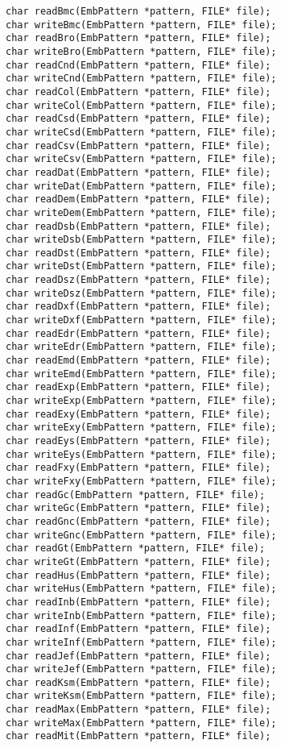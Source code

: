 \begin{lstlisting}
char readBmc(EmbPattern *pattern, FILE* file);
char writeBmc(EmbPattern *pattern, FILE* file);
char readBro(EmbPattern *pattern, FILE* file);
char writeBro(EmbPattern *pattern, FILE* file);
char readCnd(EmbPattern *pattern, FILE* file);
char writeCnd(EmbPattern *pattern, FILE* file);
char readCol(EmbPattern *pattern, FILE* file);
char writeCol(EmbPattern *pattern, FILE* file);
char readCsd(EmbPattern *pattern, FILE* file);
char writeCsd(EmbPattern *pattern, FILE* file);
char readCsv(EmbPattern *pattern, FILE* file);
char writeCsv(EmbPattern *pattern, FILE* file);
char readDat(EmbPattern *pattern, FILE* file);
char writeDat(EmbPattern *pattern, FILE* file);
char readDem(EmbPattern *pattern, FILE* file);
char writeDem(EmbPattern *pattern, FILE* file);
char readDsb(EmbPattern *pattern, FILE* file);
char writeDsb(EmbPattern *pattern, FILE* file);
char readDst(EmbPattern *pattern, FILE* file);
char writeDst(EmbPattern *pattern, FILE* file);
char readDsz(EmbPattern *pattern, FILE* file);
char writeDsz(EmbPattern *pattern, FILE* file);
char readDxf(EmbPattern *pattern, FILE* file);
char writeDxf(EmbPattern *pattern, FILE* file);
char readEdr(EmbPattern *pattern, FILE* file);
char writeEdr(EmbPattern *pattern, FILE* file);
char readEmd(EmbPattern *pattern, FILE* file);
char writeEmd(EmbPattern *pattern, FILE* file);
char readExp(EmbPattern *pattern, FILE* file);
char writeExp(EmbPattern *pattern, FILE* file);
char readExy(EmbPattern *pattern, FILE* file);
char writeExy(EmbPattern *pattern, FILE* file);
char readEys(EmbPattern *pattern, FILE* file);
char writeEys(EmbPattern *pattern, FILE* file);
char readFxy(EmbPattern *pattern, FILE* file);
char writeFxy(EmbPattern *pattern, FILE* file);
char readGc(EmbPattern *pattern, FILE* file);
char writeGc(EmbPattern *pattern, FILE* file);
char readGnc(EmbPattern *pattern, FILE* file);
char writeGnc(EmbPattern *pattern, FILE* file);
char readGt(EmbPattern *pattern, FILE* file);
char writeGt(EmbPattern *pattern, FILE* file);
char readHus(EmbPattern *pattern, FILE* file);
char writeHus(EmbPattern *pattern, FILE* file);
char readInb(EmbPattern *pattern, FILE* file);
char writeInb(EmbPattern *pattern, FILE* file);
char readInf(EmbPattern *pattern, FILE* file);
char writeInf(EmbPattern *pattern, FILE* file);
char readJef(EmbPattern *pattern, FILE* file);
char writeJef(EmbPattern *pattern, FILE* file);
char readKsm(EmbPattern *pattern, FILE* file);
char writeKsm(EmbPattern *pattern, FILE* file);
char readMax(EmbPattern *pattern, FILE* file);
char writeMax(EmbPattern *pattern, FILE* file);
char readMit(EmbPattern *pattern, FILE* file);

\end{lstlisting}

